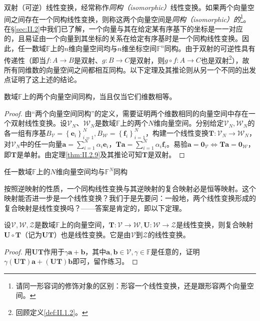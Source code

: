 \documentclass[main.tex]{subfiles}
\begin{document}
双射（可逆）线性变换，经常称作\emph{同构（isomorphic）}线性变换。如果两个向量空间之间存在一个同构线性变换，则称这两个向量空间是\emph{同构（isomorphic）的}\footnote{请同一形容词的修饰对象的区别：形容一个线性变换，还是跟形容两个向量空间。}。在\S\ref{sec:II.2}中我们已了解，一个向量与其在给定某有序基下的坐标是一一对应的，且易证由一个向量到其坐标的关系在给定有序基时是一个同构线性变换。因此，任一数域$\mathbb{F}$上的$n$维向量空间均与$n$维坐标空间$\mathbb{F}^n$同构。由于双射的可逆性具有传递性（即当$f:A\rightarrow B$是双射、$g:B\rightarrow C$是双射，则$g\circ f:A\rightarrow C$也是双射\footnote{回顾定义\ref{def:II.1.2}。}），故所有同维数的向量空间之间都相互同构。以下定理及其推论则从另一个不同的出发点证明了这上述的结论。

\begin{theorem}\label{thm:II.2.11}
    数域$\mathbb{F}$上的两个向量空间同构，当且仅当它们维数相等。
\end{theorem}
\begin{proof}
    由“两个向量空间同构”的定义，需要证明两个维数相同的向量空间中存在一个双射线性变换。设$\mathcal{V}_N$、$\mathcal{W}_N$是数域$\mathbb{F}$上的两个$N$维向量空间。分别给定$\mathcal{V}_N,\mathcal{W}_N$的各一组有序基$B_\mathcal{V}=\left\{\mathbf{e}_i\right\}_{i=1}^N, B_\mathcal{W}=\left\{\mathbf{f}_i\right\}_{i=1}^N$，构建一个线性变换$\mathbf{T}:\mathcal{V}_N\rightarrow\mathcal{W}_N$，对$\mathcal{V}_N$中的任一向量$\mathbf{a}=\sum_{i=1}^N\alpha_i\mathbf{e}_i$，$\mathbf{Ta}=\sum_{i=1}^N\alpha_i\mathbf{f}_i$。易验$\mathbf{a}=\mathbf{0}_\mathcal{V}\Leftrightarrow\mathbf{Ta}=\mathbf{0}_\mathcal{W}$，即$\mathbf{T}$是单射。由定理\ref{thm:II.2.9}及其推论可知$\mathbf{T}$是双射。
\end{proof}

\begin{corollary}
    任一数域$\mathbb{F}$上的$N$维向量空间均与$\mathbb{F}^N$同构
\end{corollary}

按照逆映射的性质，一个同构线性变换与其逆映射的复合映射必是恒等映射。这个映射能否进一步是一个线性变换？我们于是先要问：一般地，两个线性变换形成的复合映射是线性变换吗？——答案是肯定的，即以下定理。

\begin{theorem}\label{thm:II.2.12}
    设$\mathcal{V},\mathcal{W},\mathcal{Z}$是数域$\mathbb{F}$上的向量空间，$\mathbf{T}:\mathcal{V}\rightarrow\mathcal{W},\mathbf{U}:\mathcal{W}\rightarrow\mathcal{Z}$是线性变换，则复合映射$\mathbf{U}\circ\mathbf{T}$（记为$\mathbf{UT}$）也是线性变换。它是由$\mathcal{V}$到$\mathcal{Z}$的线性变换。
\end{theorem}
\begin{proof}
    用$\mathbf{UT}$作用于$\gamma\mathbf{a}+\mathbf{b}$，其中$\mathbf{a},\mathbf{b}\in\mathcal{V},\gamma\in\mathbb{F}$是任意的，证明$\gamma\left(\mathbf{UT}\right)\mathbf{a}+\left(\mathbf{UT}\right)\mathbf{b}$即可，留作练习。
\end{proof}
\end{document}
